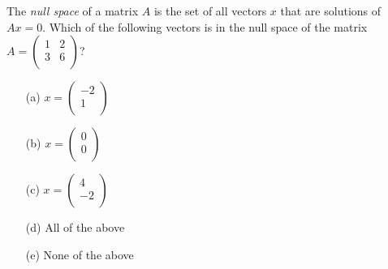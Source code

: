 \begin{problem}
    The \textit{null space} of a matrix $A$ is the set of all vectors $x$ that are solutions of
    $Ax=0$.  Which of the following vectors is in the null space of the matrix  
    $A=\left( \begin{array}{cc} 1 & 2\\ 3 & 6 \\ \end{array} \right)$?
\begin{enumerate}
    \item[(a)] $x=\left( \begin{array}{c} -2\\ 1\\ \end{array} \right)$
    \item[(b)] $x=\left( \begin{array}{c} 0\\ 0\\ \end{array} \right)$
    \item[(c)] $x=\left( \begin{array}{c} 4\\ -2\\ \end{array} \right)$ 
    \item[(d)] All of the above
    \item[(e)] None of the above
\end{enumerate}
\end{problem}
%             


